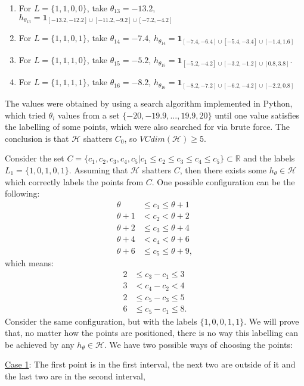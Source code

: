 \documentclass{article}
\begin{document}
\begin{multicols}{2}
\begin{enumerate}
	\item For $L=\{1, 1, 0, 0\}$, take $\theta_{13}=-13.2$,  $h_{\theta_{13}}=\mathbf 1_{[-13.2, -12.2]\cup[-11.2, -9.2]\cup[-7.2, -4.2]}$
	\item For $L=\{1, 1, 0, 1\}$, take $\theta_{14}=-7.4$,   $h_{\theta_{14}}=\mathbf 1_{[-7.4, -6.4]\cup[-5.4, -3.4]\cup[-1.4, 1.6]}$
	\item For $L=\{1, 1, 1, 0\}$, take $\theta_{15}=-5.2$,   $h_{\theta_{15}}=\mathbf 1_{[-5.2, -4.2]\cup[-3.2, -1.2]\cup[0.8, 3.8]}$.
	\item For $L=\{1, 1, 1, 1\}$, take $\theta_{16}=-8.2$,   $h_{\theta_{16}}=\mathbf 1_{[-8.2, -7.2]\cup[-6.2, -4.2]\cup[-2.2, 0.8]}$
\end{enumerate}
\end{multicols}
The values were obtained by using a search algorithm implemented in Python, which tried $\theta_i$ values from a set $\{-20,-19.9,...,19.9,20\}$ until one value satisfies the labelling of some points, which were also searched for via brute force. The conclusion is that $\mathcal{H}$ shatters $C_0$, so $VCdim(\mathcal{H})\geq 5$.

Consider the set $C=\{c_1,c_2,c_3,c_4,c_5|c_1\leq c_2\leq c_3\leq c_4 \leq c_5\}\subset\mathbb{R}$ and the labels $L_1=\{1,0,1,0,1\}$. Assuming that $\mathcal{H}$ shatters $C$, then there exists some $h_\theta\in\mathcal{H}$ which correctly labels the points from $C$. One possible configuration can be the following:
\begin{align*}
	\theta & \leq c_1 \leq \theta + 1 \\
	\theta + 1 &< c_2 < \theta + 2\\
	\theta + 2 &\leq c_3 \leq \theta + 4\\
	\theta + 4 &< c_4 < \theta + 6\\
	\theta + 6 &\leq c_5 \leq \theta + 9,
\end{align*}
which means:
\begin{align}
	2 &\leq c_3 - c_1 \leq 3\\
	3 &< c_4 - c_2 < 4 \\
	2 &\leq c_5 - c_3 \leq 5\\
	6 & \leq c_5 - c_1 \leq 8.	
\end{align}
Consider the same configuration, but with the labels $\{1,0,0,1,1\}$. We will prove that, no matter how the points are positioned, there is no way this labelling can be achieved by any $h_\theta\in\mathcal{H}$. We have two possible ways of choosing the points: 

\underline{Case 1}: The first point is in the first interval, the next two are outside of it and the last two are in the second interval,
\end{document}
